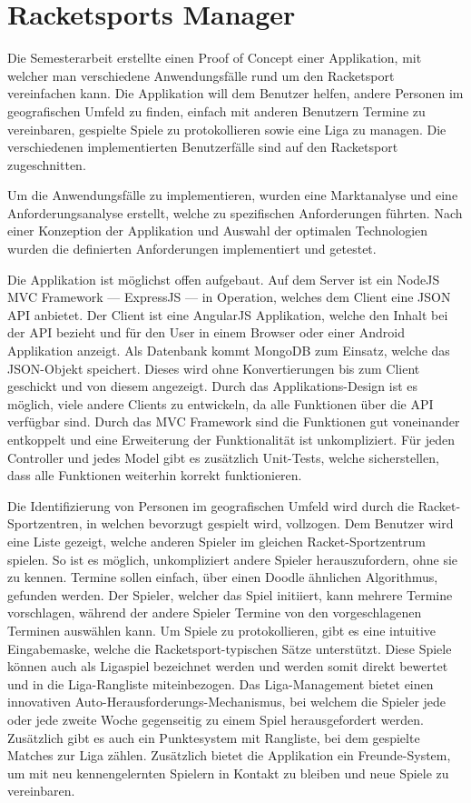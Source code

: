 \section*{Racketsports Manager}
Die Semesterarbeit erstellte einen Proof of Concept einer Applikation, mit welcher man verschiedene Anwendungsfälle rund um den Racketsport vereinfachen kann. Die Applikation will dem Benutzer helfen, andere Personen im geografischen Umfeld zu finden, einfach mit anderen Benutzern Termine zu vereinbaren, gespielte Spiele zu protokollieren sowie eine Liga zu managen. Die verschiedenen implementierten Benutzerfälle sind auf den Racketsport zugeschnitten.

Um die Anwendungsfälle zu implementieren, wurden eine Marktanalyse und eine Anforderungsanalyse erstellt, welche zu spezifischen Anforderungen führten. Nach einer Konzeption der Applikation und Auswahl der optimalen Technologien wurden die definierten Anforderungen implementiert und getestet. 

Die Applikation ist möglichst offen aufgebaut. Auf dem Server ist ein NodeJS MVC Framework --- ExpressJS --- in Operation, welches dem Client eine JSON API anbietet. Der Client ist eine AngularJS Applikation, welche den Inhalt bei der API bezieht und für den User in einem Browser oder einer Android Applikation anzeigt. Als Datenbank kommt MongoDB zum Einsatz, welche das JSON-Objekt speichert. Dieses wird ohne Konvertierungen bis zum Client geschickt und von diesem angezeigt.  Durch das Applikations-Design ist es möglich, viele andere Clients zu entwickeln, da alle Funktionen über die API verfügbar sind. Durch das MVC Framework sind die Funktionen gut voneinander entkoppelt und eine Erweiterung der Funktionalität ist unkompliziert. Für jeden Controller und jedes Model gibt es zusätzlich Unit-Tests, welche sicherstellen, dass alle Funktionen weiterhin korrekt funktionieren. 

Die Identifizierung von Personen im geografischen Umfeld wird durch die Racket-Sportzentren, in welchen bevorzugt gespielt wird, vollzogen. Dem Benutzer wird eine Liste gezeigt, welche anderen Spieler im gleichen Racket-Sportzentrum spielen. So ist es möglich, unkompliziert andere Spieler herauszufordern, ohne sie zu kennen. Termine sollen einfach, über einen Doodle ähnlichen Algorithmus, gefunden werden. Der Spieler, welcher das Spiel initiiert, kann mehrere Termine vorschlagen, während der andere Spieler Termine von den vorgeschlagenen Terminen auswählen kann. Um Spiele zu protokollieren, gibt es eine intuitive Eingabemaske, welche die Racketsport-typischen Sätze unterstützt. Diese Spiele können auch als Ligaspiel bezeichnet werden und werden somit direkt bewertet und in die Liga-Rangliste miteinbezogen.  Das Liga-Management bietet einen innovativen Auto-Herausforderungs-Mechanismus, bei welchem die Spieler jede  oder jede zweite Woche gegenseitig zu einem Spiel herausgefordert werden. Zusätzlich gibt es auch ein Punktesystem mit Rangliste, bei dem gespielte Matches zur Liga zählen. Zusätzlich bietet die Applikation ein Freunde-System, um mit neu kennengelernten Spielern in Kontakt zu bleiben und neue Spiele zu vereinbaren. 

